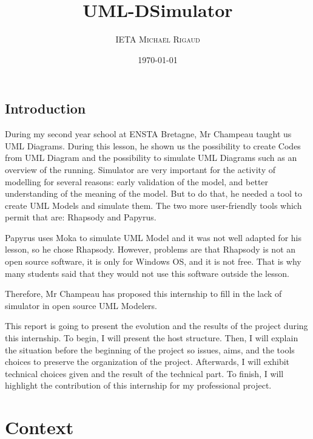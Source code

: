 \documentclass[a4paper, 11pt, oneside, oldfontcommands]{memoir}
\title{UML-DSimulator}
\author{\textsc{IETA Michaël Rigaud }}
\date{\today}
\newcounter{th}[chapter]
\begin{document}
\maketitle
\thispagestyle{empty}
\newpage




\tableofcontents



\chapter*{Introduction}


During my second year school at ENSTA Bretagne, Mr Champeau taught us UML Diagrams. During this lesson, he shown us the possibility to create Codes from UML Diagram and the possibility to simulate UML Diagrams such as an overview of the running. Simulator are very important for the activity of modelling for several reasons: early validation of the model, and better understanding of the meaning of the model. But to do that, he needed a tool to create UML Models and simulate them. The two more user-friendly tools which permit that are: Rhapsody and Papyrus.

Papyrus uses Moka to simulate UML Model and it was not well adapted for his lesson, so he chose Rhapsody. However, problems are that Rhapsody is not an open source software, it is only for Windows OS, and it is not free. That is why many students said that they would not use this software outside the lesson.

Therefore, Mr Champeau has proposed this internship to fill in the lack of simulator in open source UML Modelers.


This report is going to present the evolution and the results of the project during this internship. To begin, I will present the host structure. Then, I will explain the situation before the beginning of the project so issues, aims, and the tools choices to preserve the organization of the project. Afterwards, I will exhibit technical choices given and the result of the technical part. To finish, I will highlight the contribution of this internship for my professional project.

\newpage

\part{Context}
\end{document}
